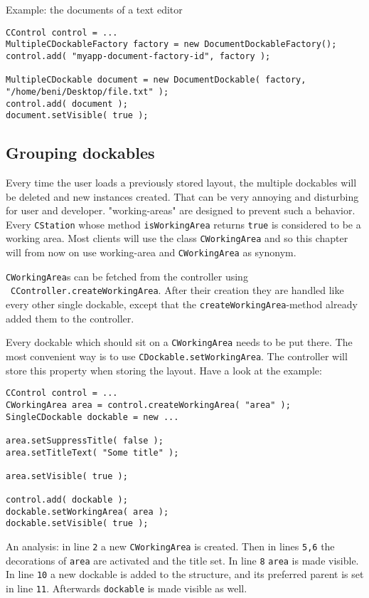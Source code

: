 \documentclass[a4paper,10pt]{article}
\newcommand{\src}[1]{\lstinline[basicstyle=\ttfamily]|#1|}
\begin{document}
Example: the documents of a text editor
\begin{lstlisting}
CControl control = ...
MultipleCDockableFactory factory = new DocumentDockableFactory();
control.add( "myapp-document-factory-id", factory );

MultipleCDockable document = new DocumentDockable( factory, "/home/beni/Desktop/file.txt" );
control.add( document );
document.setVisible( true );
\end{lstlisting}

\subsection{Grouping dockables}
Every time the user loads a previously stored layout, the multiple dockables will be deleted and new instances created. That can be very annoying and disturbing for user and developer. "working-areas" are designed to prevent such a behavior. Every \src{CStation} whose method \src{isWorkingArea} returns \src{true} is considered to be a working area. Most clients will use the class \src{CWorkingArea} and so this chapter will from now on use working-area and \src{CWorkingArea} as synonym.

\src{CWorkingArea}s can be fetched from the controller using \ \src{CController.createWorkingArea}. After their creation they are handled like every other single dockable, except that the \src{createWorkingArea}-method already added them to the controller.

Every dockable which should sit on a \src{CWorkingArea} needs to be put there. The most convenient way is to use \src{CDockable.setWorkingArea}. The controller will store this property when storing the layout. Have a look at the example:
\begin{lstlisting}
CControl control = ...
CWorkingArea area = control.createWorkingArea( "area" );
SingleCDockable dockable = new ...

area.setSuppressTitle( false );
area.setTitleText( "Some title" );

area.setVisible( true );

control.add( dockable );
dockable.setWorkingArea( area );
dockable.setVisible( true );
\end{lstlisting}
An analysis: in line \src{2} a new \src{CWorkingArea} is created. Then in lines \src{5,6} the decorations of \src{area} are activated and the title set. In line \src{8} \src{area} is made visible. In line \src{10} a new dockable is added to the structure, and its preferred parent is set in line \src{11}. Afterwards \src{dockable} is made visible as well.
\end{document}
